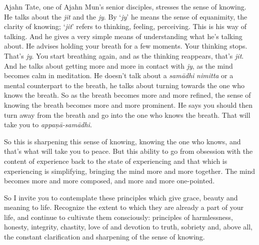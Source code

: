 Ajahn Tate, one of Ajahn Mun's senior disciples, stresses the sense of
knowing. He talks about the \emph{jit} and the \emph{jy}. By `\emph{jy}'
he means the sense of equanimity, the clarity of knowing; `\emph{jit}'
refers to thinking, feeling, perceiving. This is his way of talking. And
he gives a very simple means of understanding what he's talking about. 
He advises holding your breath for a few moments. Your thinking stops. 
That's \emph{jy}. You start breathing again, and as the thinking
reappears, that's \emph{jit}. And he talks about getting more and more
in contact with \emph{jy}, as the mind becomes calm in meditation. He
doesn't talk about a \emph{samādhi} \emph{nimitta} or a mental
counterpart to the breath, he talks about turning towards the one who
knows the breath. So as the breath becomes more and more refined, the
sense of knowing the breath becomes more and more prominent. He says you
should then turn away from the breath and go into the one who knows the
breath. That will take you to \emph{appaṇā-samādhi}. 

So this is sharpening this sense of knowing, knowing the one who knows, 
and that's what will take you to peace. But this ability to go from
obsession with the content of experience back to the state of
experiencing and that which is experiencing is simplifying, bringing the
mind more and more together. The mind becomes more and more composed, 
and more and more one-pointed. 

So I invite you to contemplate these principles which give grace, beauty
and meaning to life. Recognize the extent to which they are already a
part of your life, and continue to cultivate them consciously: 
principles of harmlessness, honesty, integrity, chastity, love of and
devotion to truth, sobriety and, above all, the constant clarification
and sharpening of the sense of knowing. 


